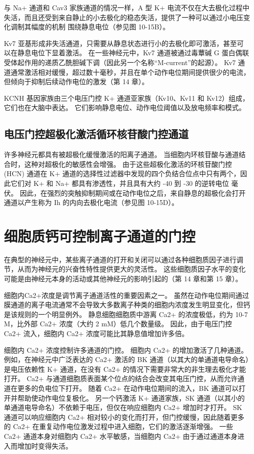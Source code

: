与 Na+ 通道和 Cav3 家族通道的情况一样，A 型 K+ 电流不仅在大去极化过程中失活，而且还受到来自静止的小去极化的稳态失活，提供了一种可以通过小电压变化调制其幅度的机制 围绕静息电位（参见图 10-15B）。

Kv7 亚基形成非失活通道，只需要从静息状态进行小的去极化即可激活，甚至可以在静息电位下显着激活。 在一些神经元中，Kv7 通道被通过毒蕈碱 G 蛋白偶联受体起作用的递质乙酰胆碱下调（因此另一个名称“M-current”的起源）。 Kv7 通道通常激活相对缓慢，超过数十毫秒，并且在单个动作电位期间提供很少的电流，但倾向于抑制后续动作电位的激发（第 14 章）。

KCNH 基因家族由三个电压门控 K+ 通道亚家族（Kv10、Kv11 和 Kv12）组成，它们也在大脑中表达。 它们影响静息电位、动作电位阈值以及放电频率和模式。

\subsection{电压门控超极化激活循环核苷酸门控通道}
许多神经元都具有被超极化缓慢激活的阳离子通道。 当细胞内环核苷酸与通道结合时，这种对超极化的敏感性会增强。 由于这些超极化激活的环核苷酸门控 (HCN) 通道在 K+ 通道的选择性过滤器中发现的四个负结合位点中只有两个，因此它们对 K+ 和 Na+ 都具有渗透性，并且具有大约 -40 到 -30 的逆转电位 毫伏。 因此，在强烈的突触抑制期间或在动作电位之后，来自静息的超极化会打开通道以产生称为 Ih 的内向去极化电流（参见图 10-15D）。

\section{细胞质钙可控制离子通道的门控}
在典型的神经元中，某些离子通道的打开和关闭可以通过各种细胞质因子进行调节，从而为神经元的兴奋性特性提供更大的灵活性。 这些细胞质因子水平的变化可能是由神经元本身的活动或其他神经元的影响引起的（第 14 章和第 15 章）。

细胞内Ca2+浓度是调节离子通道活性的重要因素之一。 虽然在动作电位期间通过膜通道的离子电流通常不会导致大多数离子种类的细胞内浓度发生明显变化，但钙是该规则的一个明显例外。 静息细胞细胞质中游离 Ca2+ 的浓度极低，约为 10-7 M，比外部 Ca2+ 浓度（大约 2 mM）低几个数量级。 因此，由于电压门控 Ca2+ 流入，细胞内 Ca2+ 浓度可能比其静息值增加许多倍。

细胞内 Ca2+ 浓度控制许多通道的门控。 细胞内 Ca2+ 的增加激活了几种通道。 例如，在神经元中广泛表达的 Ca2+ 激活的 BK 通道（以其大的单通道电导命名）是电压依赖性 K+ 通道，在没有 Ca2+ 的情况下需要非常大的非生理去极化才能打开。 Ca2+ 与通道细胞质表面某个位点的结合会改变其电压门控，从而允许通道在更多的负电位下打开。 随着 Ca2+ 在动作电位期间的流入，BK 通道可以打开并帮助使动作电位复极化。 另一个钙激活 K+ 通道家族，SK 通道（以其小的单通道电导命名）不依赖于电压，但仅在响应细胞内 Ca2+ 增加时才打开。 SK 通道可以响应细胞内 Ca2+ 相对较小的变化而打开，但门控缓慢，因此随着更多的 Ca2+ 在重复动作电位激发过程中进入细胞，它们的激活逐渐增强。 一些 Ca2+ 通道本身对细胞内 Ca2+ 水平敏感，当细胞内 Ca2+ 由于通过通道本身进入而增加时变得失活。

